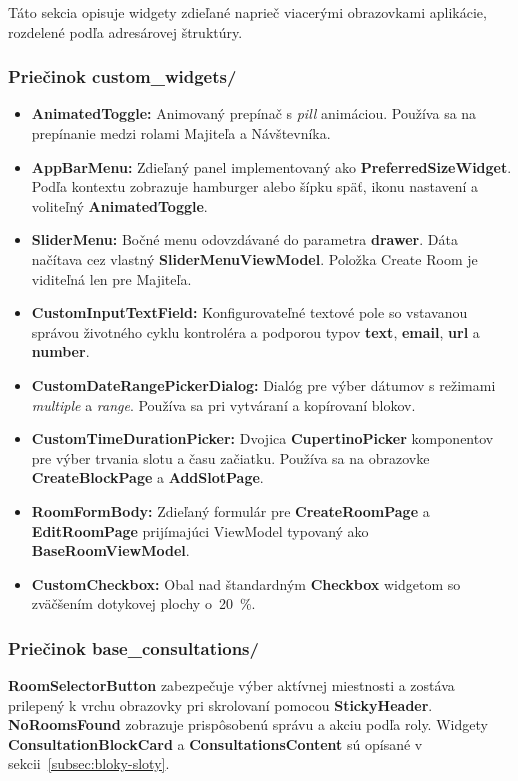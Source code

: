 Táto sekcia opisuje widgety zdieľané naprieč viacerými obrazovkami aplikácie,
rozdelené podľa adresárovej štruktúry.

\subsubsection{Priečinok custom\_widgets/}
\begin{itemize}
    \item \textbf{AnimatedToggle:} Animovaný prepínač s \textit{pill} animáciou. Používa sa na prepínanie medzi rolami Majiteľa a Návštevníka.
    \item \textbf{AppBarMenu:} Zdieľaný panel implementovaný ako \textbf{PreferredSizeWidget}. Podľa kontextu zobrazuje hamburger alebo šípku späť, ikonu nastavení a voliteľný \textbf{AnimatedToggle}.
    \item \textbf{SliderMenu:} Bočné menu odovzdávané do parametra \textbf{drawer}. Dáta načítava cez vlastný \textbf{SliderMenuViewModel}. Položka Create Room je viditeľná len pre Majiteľa.
    \item \textbf{CustomInputTextField:} Konfigurovateľné textové pole so vstavanou správou životného cyklu kontroléra a podporou typov \textbf{text}, \textbf{email}, \textbf{url} a \textbf{number}.
    \item \textbf{CustomDateRangePickerDialog:} Dialóg pre výber dátumov s režimami \textit{multiple} a \textit{range}. Používa sa pri vytváraní a kopírovaní blokov.
    \item \textbf{CustomTimeDurationPicker:} Dvojica \textbf{CupertinoPicker} komponentov pre výber trvania slotu a času začiatku. Používa sa na obrazovke \textbf{CreateBlockPage} a \textbf{AddSlotPage}.
    \item \textbf{RoomFormBody:} Zdieľaný formulár pre \textbf{CreateRoomPage} a \textbf{EditRoomPage} prijímajúci ViewModel typovaný ako \textbf{BaseRoomViewModel}.
    \item \textbf{CustomCheckbox:} Obal nad štandardným \textbf{Checkbox} widgetom so zväčšením dotykovej plochy o~20~\%.
\end{itemize}

\subsubsection{Priečinok base\_consultations/}
\textbf{RoomSelectorButton} zabezpečuje výber aktívnej miestnosti a zostáva prilepený
k vrchu obrazovky pri skrolovaní pomocou \textbf{StickyHeader}. \textbf{NoRoomsFound} zobrazuje prispôsobenú správu a akciu podľa roly. Widgety
\textbf{ConsultationBlockCard} a \textbf{ConsultationsContent} sú opísané
v sekcii~\ref{subsec:bloky-sloty}.

